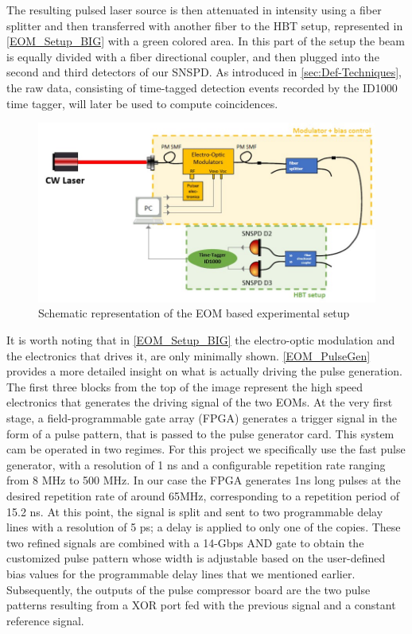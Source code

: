The resulting pulsed laser source is then attenuated in intensity using a fiber splitter and then transferred with another fiber to the HBT setup, represented in \autoref{EOM_Setup_BIG} with a green colored area.
In this part of the setup the beam is equally divided with a fiber directional coupler, and then plugged into the second and third detectors of our SNSPD. As introduced in \autoref{sec:Def-Techniques}, the raw data, consisting of time-tagged detection events recorded by the ID1000 time tagger, will later be used to compute coincidences. 
\begin{figure}[hbtp]
\centering
\includegraphics[width=1\textwidth]{EOMsetupBIG.jpg}
\caption{Schematic representation of the EOM based experimental setup}
\label{EOM_Setup_BIG}
\end{figure}
It is worth noting that in \autoref{EOM_Setup_BIG} the electro-optic modulation and the electronics that drives it, are only minimally shown. \autoref{EOM_PulseGen} provides a more detailed insight on what is actually driving the pulse generation.
The first three blocks from the top of the image represent the high speed electronics that generates the driving signal of the two EOMs.
At the very first stage, a field-programmable gate array (FPGA) generates a trigger signal in the form of a pulse pattern, that is passed to the pulse generator card. This system cam be operated in two regimes. For this project we specifically use the fast pulse generator, with a resolution of 1 ns and a configurable repetition rate ranging from 8 MHz to 500 MHz.
In our case the FPGA generates 1ns long pulses at the desired repetition rate of around 65MHz, corresponding to a repetition period of 15.2 ns.  
At this point, the signal is split and sent to two programmable delay lines with a resolution of 5 ps; a delay is applied to only one of the copies.
These two refined signals are combined with a 14-Gbps AND gate to obtain the customized pulse pattern whose width is adjustable based on the user-defined bias values for the programmable delay lines that we mentioned earlier.
Subsequently, the outputs of the pulse compressor board are the two pulse patterns resulting from a XOR port fed with the previous signal and a constant reference signal.

